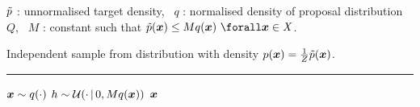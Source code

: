 \begin{algorithmic}
\small
    \Require
    $\tilde{p}$ : unnormalised target density,~
    $q$ : normalised density of proposal distribution $Q$,~
    $M$ : constant such that $\utgtdens(\vct{x}) \leq Mq(\vct{x}) ~\forall \vct{x} \in \set{X}$.
    \Ensure\raggedright
    Independent sample from distribution with density $p(\boldsymbol{x}) = \frac{1}{Z} \tilde{p}(\boldsymbol{x})$.
\end{algorithmic}
\hrule
\small
\begin{algorithmic}[1]
  \Repeat
    \State $\boldsymbol{x} \sim q(\cdot)$ 
    \State $h \sim \mathcal{U}(\cdot \operatorname{|} 0,Mq(\boldsymbol{x}))$
  \State \Return $\boldsymbol{x}$
\end{algorithmic}
